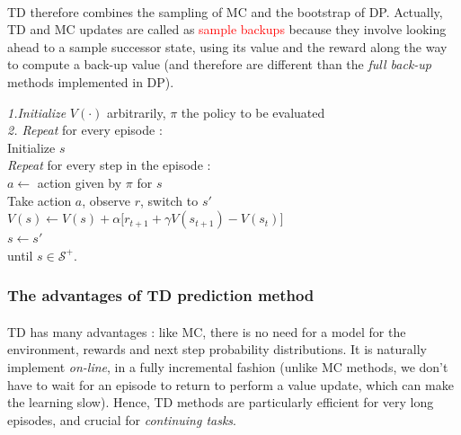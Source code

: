 \documentclass[a4paper]{article}
\begin{document}
{{{{				\paragraph{} TD therefore combines the sampling of MC and the bootstrap of DP. Actually, TD and MC updates are called as \textcolor{red}{sample backups} because they involve looking ahead to a sample successor state, using its value and the reward along the way to compute a back-up value (and therefore are different than the \emph{full back-up} methods implemented in DP). 
				
				\vspace{10pt}
				
				{
					\begin{algorithm}[H]
	 					\SetAlgoLined
						\LinesNumbered
						 \textsf{\emph{1.Initialize }} $V(\cdot)$ arbitrarily, $\pi$ the policy to be evaluated\\
						 \BlankLine 
						 \BlankLine
						\textsf{\emph{2. Repeat}} for every episode : \\
							\Indp \Indp 
								Initialize $s$ \\
								\textsf{\emph{Repeat}} for every step in the episode : \\
								\Indp \Indp 
									$a\leftarrow$ action given by $\pi$ for $s$ \\
									Take action $a$, observe $r$, switch to $s'$ \\
									$V(s) \leftarrow V(s) + \alpha \big [ r_{t+1} + \gamma V(s_{t+1}) - V(s_t)\big]$\\
									$s\leftarrow s'$\\
								\Indm \Indm 
							until $s\in\mathcal{S}^+$. 
							\Indm \Indm 				
					\end{algorithm}
				}
			}				
			\subsubsection{The advantages of TD prediction method}
			{	
				\paragraph{} TD has many advantages : like MC, there is no need for a model for the environment, rewards and next step probability distributions. It is naturally implement \emph{on-line}, in a fully incremental fashion (unlike MC methods, we don't have to wait for an episode to return to perform a value update, which can make the learning slow). Hence, TD methods are particularly efficient for very long episodes, and crucial for \emph{continuing tasks}. 
				
}}}}
\end{document}
